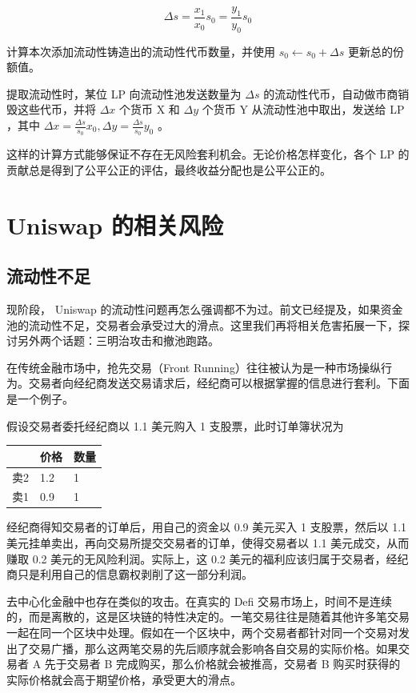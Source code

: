 \documentclass[12pt, a4paper, oneside]{ctexart}
\begin{document}
\begin{equation}
    \Delta s = \frac{x_1}{x_0} s_0 = \frac{y_1}{y_0} s_0
\end{equation}

\noindent 计算本次添加流动性铸造出的流动性代币数量，并使用 $s_0 \leftarrow s_0 + \Delta s$ 更新总的份额值。

提取流动性时，某位 LP 向流动性池发送数量为 $\Delta s$ 的流动性代币，自动做市商销毁这些代币，并将 $\Delta x$ 个货币 X 和 $\Delta y$ 个货币 Y 从流动性池中取出，发送给 LP ，其中 $\displaystyle \Delta x = \frac{\Delta s}{s_0} x_0, \Delta y = \frac{\Delta s}{s_0} y_0$ 。

这样的计算方式能够保证不存在无风险套利机会。无论价格怎样变化，各个 LP 的贡献总是得到了公平公正的评估，最终收益分配也是公平公正的。

\section{Uniswap 的相关风险}

\subsection{流动性不足}

现阶段， Uniswap 的流动性问题再怎么强调都不为过。前文已经提及，如果资金池的流动性不足，交易者会承受过大的滑点。这里我们再将相关危害拓展一下，探讨另外两个话题：三明治攻击和撤池跑路。

在传统金融市场中，抢先交易（Front Running）往往被认为是一种市场操纵行为。交易者向经纪商发送交易请求后，经纪商可以根据掌握的信息进行套利。下面是一个例子。

假设交易者委托经纪商以 1.1 美元购入 1 支股票，此时订单簿状况为

\begin{table}[htbp]
    \centering
    \begin{tabular}{lll}
        & 价格  & 数量 \\ \hline
        卖2 & 1.2 & 1  \\ \hline
        卖1 & 0.9 & 1 
    \end{tabular}
\end{table}

\noindent 经纪商得知交易者的订单后，用自己的资金以 0.9 美元买入 1 支股票，然后以 1.1 美元挂单卖出，再向交易所提交交易者的订单，使得交易者以 1.1 美元成交，从而赚取 0.2 美元的无风险利润。实际上，这 0.2 美元的福利应该归属于交易者，经纪商只是利用自己的信息霸权剥削了这一部分利润。

去中心化金融中也存在类似的攻击。在真实的 Defi 交易市场上，时间不是连续的，而是离散的，这是区块链的特性决定的。一笔交易往往是随着其他许多笔交易一起在同一个区块中处理。假如在一个区块中，两个交易者都针对同一个交易对发出了交易广播，那么这两笔交易的先后顺序就会影响各自交易的实际价格。如果交易者 A 先于交易者 B 完成购买，那么价格就会被推高，交易者 B 购买时获得的实际价格就会高于期望价格，承受更大的滑点。
\end{document}
